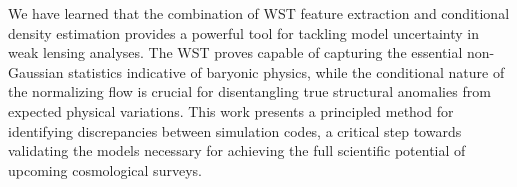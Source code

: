 \documentclass[]{article}
\begin{document}
We have learned that the combination of WST feature extraction and conditional density estimation provides a powerful tool for tackling model uncertainty in weak lensing analyses. The WST proves capable of capturing the essential non-Gaussian statistics indicative of baryonic physics, while the conditional nature of the normalizing flow is crucial for disentangling true structural anomalies from expected physical variations. This work presents a principled method for identifying discrepancies between simulation codes, a critical step towards validating the models necessary for achieving the full scientific potential of upcoming cosmological surveys.


{}

\end{document}
